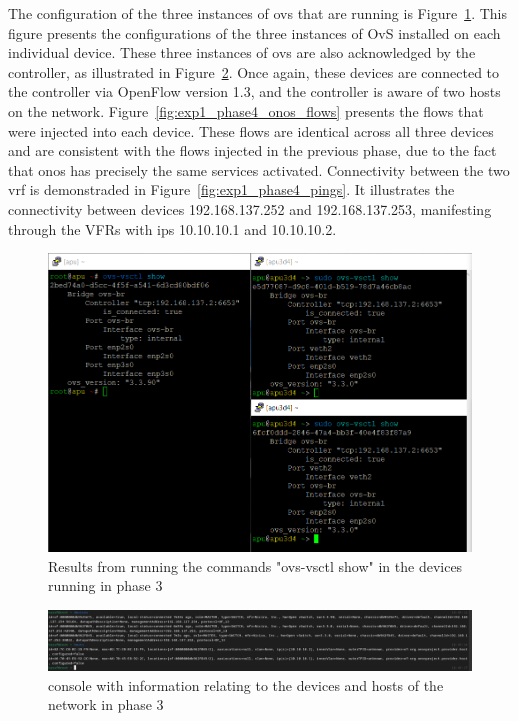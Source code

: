 The configuration of the three instances of \gls{ovs} that are running is Figure~\ref{fig:exp1_phase4_config}. This figure presents the configurations of the three instances of OvS installed on each individual device. These three instances of \gls{ovs} are also acknowledged by the controller, as illustrated in Figure~\ref{fig:exp1_phase4_onos}. Once again, these devices are connected to the controller via OpenFlow version 1.3, and the controller is aware of two hosts on the network. 
Figure~\ref{fig:exp1_phase4_onos_flows} presents the flows that were injected into each device. These flows are identical across all three devices and are consistent with the flows injected in the previous phase, due to the fact that \gls{onos} has precisely the same services activated.
Connectivity between the two \gls{vrf} is demonstraded in Figure~\ref{fig:exp1_phase4_pings}. It illustrates the connectivity between devices 192.168.137.252 and 192.168.137.253, manifesting through the VFRs with \glspl{ip} 10.10.10.1 and 10.10.10.2.

\begin{figure}
	\centering
	\includegraphics[width=\textwidth]{Chapters/Figures/tests/ovs_phase_4/ovs_config.PNG}
	\caption{Results from running the commands "ovs-vsctl show" in the devices running  in phase 3}
	\label{fig:exp1_phase4_config}
\end{figure}

\begin{figure}
	\centering
	\includegraphics[width=\textwidth]{Chapters/Figures/tests/ovs_phase_4/onos_topology.PNG}
	\caption{ console with information relating to the devices and hosts of the network in phase 3}
	\label{fig:exp1_phase4_onos}
\end{figure}


